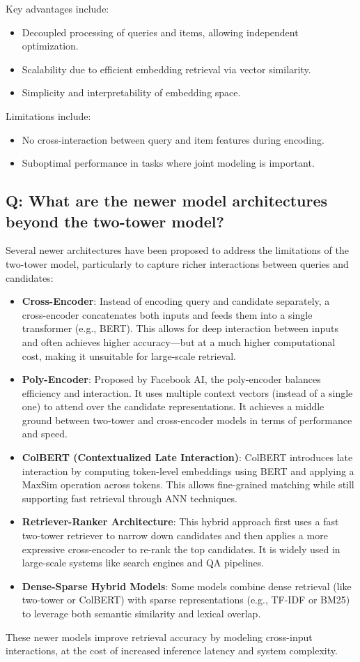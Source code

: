 Key advantages include:
\begin{itemize}
	\item Decoupled processing of queries and items, allowing independent optimization.
	\item Scalability due to efficient embedding retrieval via vector similarity.
	\item Simplicity and interpretability of embedding space.
\end{itemize}

Limitations include:
\begin{itemize}
	\item No cross-interaction between query and item features during encoding.
	\item Suboptimal performance in tasks where joint modeling is important.
\end{itemize}

\subsection*{Q: What are the newer model architectures beyond the two-tower model?}
Several newer architectures have been proposed to address the limitations of the two-tower model, particularly to capture richer interactions between queries and candidates:

\begin{itemize}
	\item \textbf{Cross-Encoder}: Instead of encoding query and candidate separately, a cross-encoder concatenates both inputs and feeds them into a single transformer (e.g., BERT). This allows for deep interaction between inputs and often achieves higher accuracy—but at a much higher computational cost, making it unsuitable for large-scale retrieval.

	\item \textbf{Poly-Encoder}: Proposed by Facebook AI, the poly-encoder balances efficiency and interaction. It uses multiple context vectors (instead of a single one) to attend over the candidate representations. It achieves a middle ground between two-tower and cross-encoder models in terms of performance and speed.

	\item \textbf{ColBERT (Contextualized Late Interaction)}: ColBERT introduces late interaction by computing token-level embeddings using BERT and applying a MaxSim operation across tokens. This allows fine-grained matching while still supporting fast retrieval through ANN techniques.

	\item \textbf{Retriever-Ranker Architecture}: This hybrid approach first uses a fast two-tower retriever to narrow down candidates and then applies a more expressive cross-encoder to re-rank the top candidates. It is widely used in large-scale systems like search engines and QA pipelines.

	\item \textbf{Dense-Sparse Hybrid Models}: Some models combine dense retrieval (like two-tower or ColBERT) with sparse representations (e.g., TF-IDF or BM25) to leverage both semantic similarity and lexical overlap.
\end{itemize}

These newer models improve retrieval accuracy by modeling cross-input interactions, at the cost of increased inference latency and system complexity.
